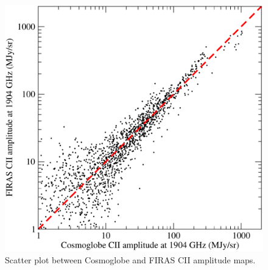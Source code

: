 \documentclass{aa}
\begin{document}
\begin{figure}
    \centering
    \includegraphics[width=\columnwidth]{figures/scatter_CII.pdf}
    \caption{Scatter plot between Cosmoglobe and FIRAS CII amplitude maps.}
    \label{fig:scatter_cg_firas}
\end{figure}
\end{document}
